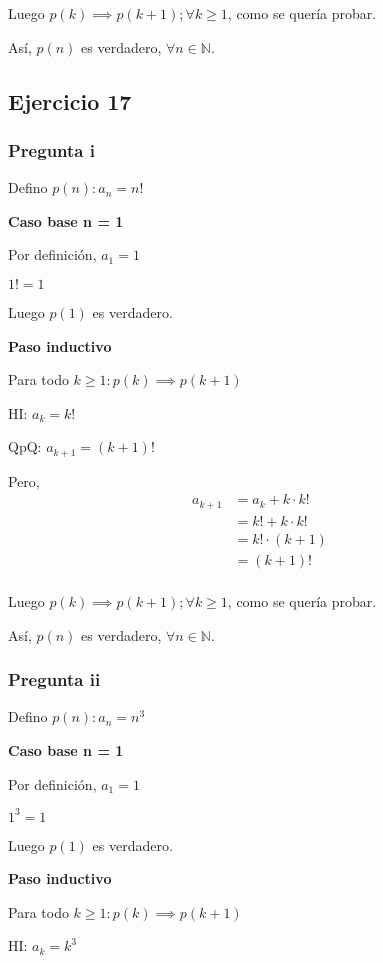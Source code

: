 Luego $p(k) \implies p(k+1); \forall k \geq 1$, como se quería probar.

Así, $p(n)$ es verdadero, $\forall n \in \mathbb{N}$.

\subsection{Ejercicio 17}

\subsubsection{Pregunta i}

Defino $ p(n): a_n = n! $

\textbf{Caso base n = 1}

Por definición, $a_1 = 1$

$ 1! = 1 $

Luego $ p(1) $ es verdadero.

\textbf{Paso inductivo}

Para todo $k \geq 1: p(k) \implies p(k+1)$

HI: $ a_k = k!$

QpQ: $ a_{k+1} = (k+1)!$

Pero,
\begin{align*}
    a_{k+1} &= a_k + k\cdot k! \\
    &= k! + k\cdot k! \\
    &= k! \cdot (k+1) \\
    &= (k+1)! \\
\end{align*}

Luego $p(k) \implies p(k+1); \forall k \geq 1$, como se quería probar.

Así, $p(n)$ es verdadero, $\forall n \in \mathbb{N}$.

\subsubsection{Pregunta ii}

Defino $ p(n): a_n = n^3 $

\textbf{Caso base n = 1}

Por definición, $a_1 = 1$

$ 1^3 = 1 $

Luego $ p(1) $ es verdadero.

\textbf{Paso inductivo}

Para todo $k \geq 1: p(k) \implies p(k+1)$

HI: $ a_k = k^3 $

